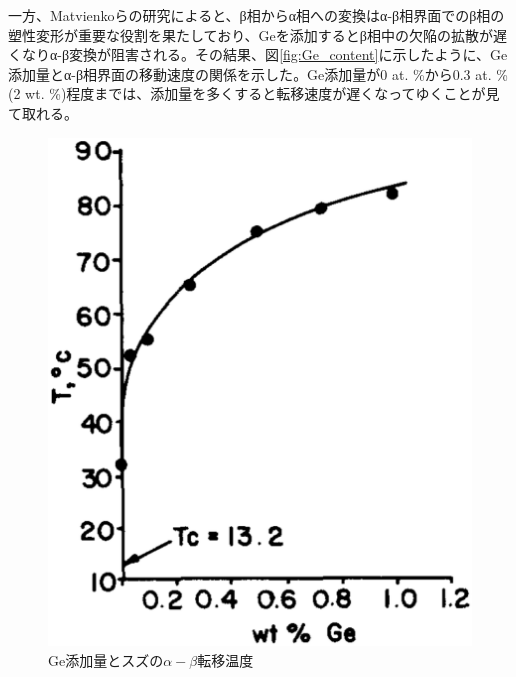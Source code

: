 一方、Matvienkoらの研究\cite{Matvienko}によると、β相からα相への変換はα-β相界面でのβ相の塑性変形が重要な役割を果たしており、Geを添加するとβ相中の欠陥の拡散が遅くなりα-β変換が阻害される。その結果、図\ref{fig:Ge_content}に示したように、Ge添加量とα-β相界面の移動速度の関係を示した\cite{Matvienko}。Ge添加量が0 at. \%から0.3 at. \%(2 wt. \%)程度までは、添加量を多くすると転移速度が遅くなってゆくことが見て取れる。
\begin{figure}[!h]
 \begin{minipage}{0.4\hsize}
    \begin{center}
   \includegraphics[width=\hsize]{Introduction/Ge_Stabilized_Sn.eps}
  \end{center}
  \caption{Ge添加量とスズの$\alpha-\beta$転移温度\cite{Vnuk1984}}
  \label{fig:Ge_Stabilized_Sn}
 \end{minipage}
 \begin{minipage}{0.6\hsize}
    \begin{center}

\end{center}
\end{minipage}
\end{figure}
